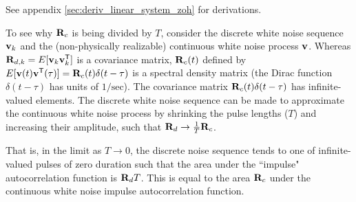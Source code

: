 See appendix \ref{sec:deriv_linear_system_zoh} for derivations.

To see why $\mathbf{R}_c$ is being divided by $T$, consider the discrete white
noise sequence $\mathbf{v}_k$ and the (non-physically realizable) continuous white
noise process $\mathbf{v}$. Whereas $\mathbf{R}_{d,k} = E[\mathbf{v}_k \mathbf{v}_k^\mathsf{T}]$ is a
covariance matrix, $\mathbf{R}_c(t)$ defined by
$E[\mathbf{v}(t) \mathbf{v}^\mathsf{T}(\tau)] = \mathbf{R}_c(t)\delta(t - \tau)$ is a spectral
density matrix (the Dirac function $\delta(t - \tau)$ has units of
$1/\text{sec}$). The covariance matrix $\mathbf{R}_c(t)\delta(t - \tau)$ has
infinite-valued elements. The discrete white noise sequence can be made to
approximate the continuous white noise process by shrinking the pulse lengths
($T$) and increasing their amplitude, such that
$\mathbf{R}_d \rightarrow \frac{1}{T}\mathbf{R}_c$.

That is, in the limit as $T \rightarrow 0$, the discrete noise sequence tends to
one of infinite-valued pulses of zero duration such that the area under the
``impulse" autocorrelation function is $\mathbf{R}_d T$. This is equal to the area
$\mathbf{R}_c$ under the continuous white noise impulse autocorrelation function.

